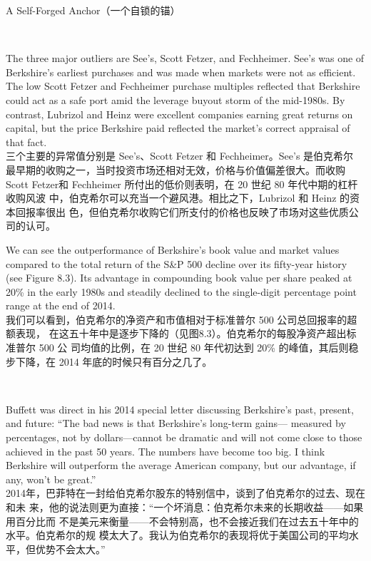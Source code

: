 \begin{section}{A Self-Forged Anchor（一个自锁的锚）}
\begin{verseparallel}
\end{verseparallel}

{\color{red}{此处缺图 8.2}} \\

\begin{verseparallel}
  {
    The three major outliers are See's, Scott Fetzer, and Fechheimer. See's
    was one of Berkshire's earliest purchases and was made when markets were
    not as efficient. The low Scott Fetzer and Fechheimer purchase multiples
    reflected that Berkshire could act as a safe port amid the leverage buyout
    storm of the mid-1980s. By contrast, Lubrizol and Heinz were excellent
    companies earning great returns on capital, but the price Berkshire paid
    reflected the market's correct appraisal of that fact. \\
  }
  {
    三个主要的异常值分别是 See's、Scott Fetzer 和 Fechheimer。See's 是伯克希尔
    最早期的收购之一，当时投资市场还相对无效，价格与价值偏差很大。而收购 Scott
    Fetzer和 Fechheimer 所付出的低价则表明，在 20 世纪 80 年代中期的杠杆收购风波
    中，伯克希尔可以充当一个避风港。相比之下，Lubrizol 和 Heinz 的资本回报率很出
    色，但伯克希尔收购它们所支付的价格也反映了市场对这些优质公司的认可。
  }
\end{verseparallel}

\begin{verseparallel}
  {
    We can see the outperformance of Berkshire's book value and market values
    compared to the total return of the S\&P 500 decline over its fifty-year
    history (see Figure 8.3). Its advantage in compounding book value per share
    peaked at 20\% in the early 1980s and steadily declined to the single-digit
    percentage point range at the end of 2014. \\
  }
  {
    我们可以看到，伯克希尔的净资产和市值相对于标准普尔 500 公司总回报率的超额表现，
    在这五十年中是逐步下降的（见图8.3）。伯克希尔的每股净资产超出标准普尔 500 公
    司均值的比例，在 20 世纪 80 年代初达到 20\% 的峰值，其后则稳步下降，在 2014
    年底的时候只有百分之几了。
  }
\end{verseparallel}

{\color{red}{此处缺图 8.3 和图 8.4}} \\

\begin{verseparallel}
  {
    Buffett was direct in his 2014 special letter discussing Berkshire's past,
    present, and future: ``The bad news is that Berkshire's long-term gains—
    measured by percentages, not by dollars—cannot be dramatic and will not come
    close to those achieved in the past 50 years. The numbers have become too
    big. I think Berkshire will outperform the average American company, but our
    advantage, if any, won't be great.'' \\
  }
  {
    2014年，巴菲特在一封给伯克希尔股东的特别信中，谈到了伯克希尔的过去、现在和未
    来，他的说法则更为直接：“一个坏消息：伯克希尔未来的长期收益——如果用百分比而
    不是美元来衡量——不会特别高，也不会接近我们在过去五十年中的水平。伯克希尔的规
    模太大了。我认为伯克希尔的表现将优于美国公司的平均水平，但优势不会太大。”
  }
\end{verseparallel}


\end{section}
